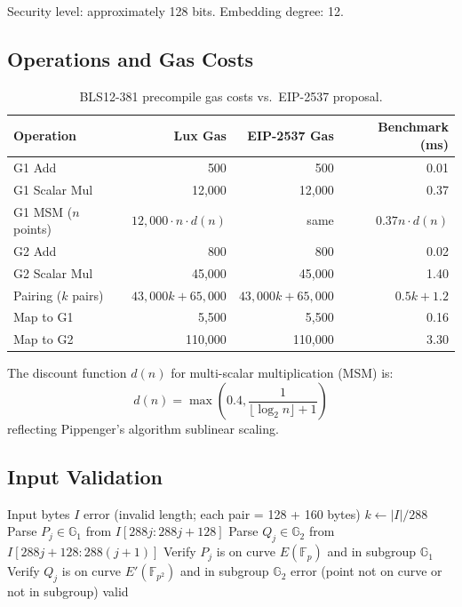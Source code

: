 \documentclass[11pt,a4paper]{article}
\begin{document}
Security level: approximately 128 bits. Embedding degree: 12.

\subsection{Operations and Gas Costs}

\begin{table}[H]
\centering
\caption{BLS12-381 precompile gas costs vs.\ EIP-2537 proposal.}
\label{tab:bls_gas}
\begin{tabular}{lrrr}
\toprule
\textbf{Operation} & \textbf{Lux Gas} & \textbf{EIP-2537 Gas} & \textbf{Benchmark (ms)} \\
\midrule
G1 Add & 500 & 500 & 0.01 \\
G1 Scalar Mul & 12,000 & 12,000 & 0.37 \\
G1 MSM ($n$ points) & $12{,}000 \cdot n \cdot d(n)$ & same & $0.37n \cdot d(n)$ \\
G2 Add & 800 & 800 & 0.02 \\
G2 Scalar Mul & 45,000 & 45,000 & 1.40 \\
Pairing ($k$ pairs) & $43{,}000k + 65{,}000$ & $43{,}000k + 65{,}000$ & $0.5k + 1.2$ \\
Map to G1 & 5,500 & 5,500 & 0.16 \\
Map to G2 & 110,000 & 110,000 & 3.30 \\
\bottomrule
\end{tabular}
\end{table}

The discount function $d(n)$ for multi-scalar multiplication (MSM) is:
\begin{equation}
    d(n) = \max\left(0.4, \frac{1}{\lfloor \log_2 n \rfloor + 1}\right)
\end{equation}
reflecting Pippenger's algorithm sublinear scaling.

\subsection{Input Validation}

\begin{algorithm}[H]
\caption{BLS12-381 Pairing Input Validation}
\label{alg:bls_validate}
\begin{algorithmic}[1]
\Require Input bytes $I$
    \State \Return error (invalid length; each pair = 128 + 160 bytes)
\EndIf
\State $k \gets |I| / 288$
    \State Parse $P_j \in \mathbb{G}_1$ from $I[288j : 288j + 128]$
    \State Parse $Q_j \in \mathbb{G}_2$ from $I[288j + 128 : 288(j+1)]$
    \State Verify $P_j$ is on curve $E(\mathbb{F}_p)$ and in subgroup $\mathbb{G}_1$
    \State Verify $Q_j$ is on curve $E'(\mathbb{F}_{p^2})$ and in subgroup $\mathbb{G}_2$
        \State \Return error (point not on curve or not in subgroup)
    \EndIf
\EndFor
\State \Return valid
\end{algorithmic}
\end{algorithm}
\end{document}
